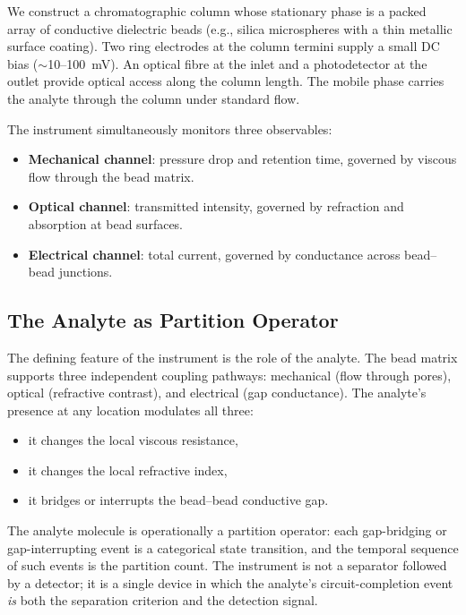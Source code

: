 \documentclass[twocolumn,10pt,a4paper]{article}
\theoremstyle{definition}
\theoremstyle{remark}
\begin{document}
We construct a chromatographic column whose stationary phase is a packed array of conductive dielectric beads (e.g., silica microspheres with a thin metallic surface coating). Two ring electrodes at the column termini supply a small DC bias ($\sim$10--100~mV). An optical fibre at the inlet and a photodetector at the outlet provide optical access along the column length. The mobile phase carries the analyte through the column under standard flow.

The instrument simultaneously monitors three observables:
\begin{itemize}[leftmargin=1.2em,nosep]
\item \textbf{Mechanical channel}: pressure drop and retention time, governed by viscous flow through the bead matrix.
\item \textbf{Optical channel}: transmitted intensity, governed by refraction and absorption at bead surfaces.
\item \textbf{Electrical channel}: total current, governed by conductance across bead--bead junctions.
\end{itemize}

\subsection{The Analyte as Partition Operator}

The defining feature of the instrument is the role of the analyte. The bead matrix supports three independent coupling pathways: mechanical (flow through pores), optical (refractive contrast), and electrical (gap conductance). The analyte's presence at any location modulates all three:

\begin{itemize}[leftmargin=1.2em,nosep]
\item it changes the local viscous resistance,
\item it changes the local refractive index,
\item it bridges or interrupts the bead--bead conductive gap.
\end{itemize}

The analyte molecule is operationally a partition operator: each gap-bridging or gap-interrupting event is a categorical state transition, and the temporal sequence of such events is the partition count. The instrument is not a separator followed by a detector; it is a single device in which the analyte's circuit-completion event \emph{is} both the separation criterion and the detection signal.
\end{document}
